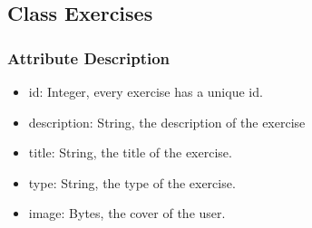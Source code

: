 \documentclass[16pt]{scrreprt}
\begin{document}
\subsection{Class Exercises}
\subsubsection{Attribute Description}
\begin{itemize}
    \item id: Integer, every exercise has a unique id.
    \item description: String, the description of the exercise
    \item title: String, the title of the exercise.
    \item type: String, the type of the exercise.
    \item image: Bytes, the cover of the user.
\end{itemize}
\end{document}
